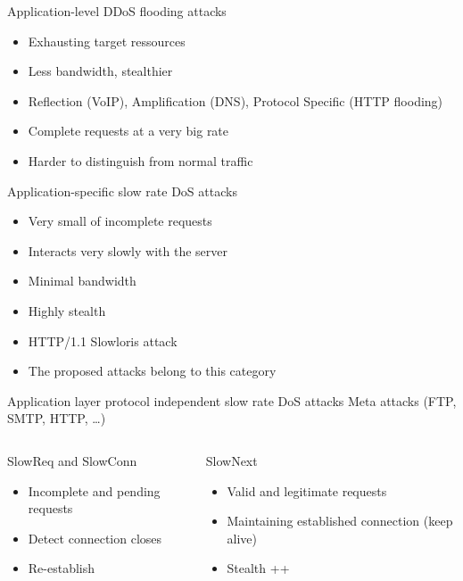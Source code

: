 \documentclass{beamer}
\begin{document}
\begin{frame}{Application-level DDoS flooding attacks}
\begin{itemize}
	\item Exhausting target ressources
	\item Less bandwidth, stealthier
	\item Reflection (VoIP), Amplification (DNS), Protocol Specific (HTTP flooding)
	\item Complete requests at a very big rate
	\item Harder to distinguish from normal traffic
\end{itemize}
\end{frame}

\begin{frame}{Application-specific slow rate DoS attacks}
\begin{itemize}
	\item Very small of incomplete requests
	\item Interacts very slowly with the server
	\item Minimal bandwidth
	\item Highly stealth
	\item HTTP/1.1 Slowloris attack
	\item The proposed attacks belong to this category
\end{itemize}
\end{frame}

\begin{frame}{Application layer protocol independent slow rate DoS attacks}
  Meta attacks (FTP, SMTP, HTTP, \ldots)
  \begin{columns}[T,onlytextwidth]
      \begin{block}{SlowReq and SlowConn}
      \begin{itemize}
        \item Incomplete and pending requests
	\item Detect connection closes
	\item Re-establish
      \end{itemize}
	\end{block}

      \begin{block}{SlowNext}
      \begin{itemize}
        \item Valid and legitimate requests
	\item Maintaining established connection (keep alive)
	\item Stealth ++
      \end{itemize}
	\end{block}

  \end{columns}
\end{frame}
\end{document}
